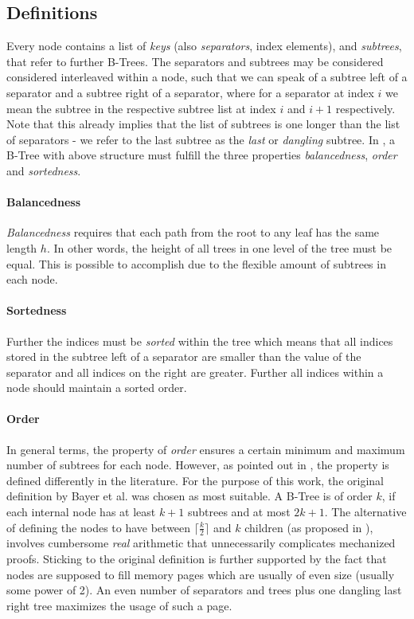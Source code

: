 \subsection{Definitions}
\label{sec:data_structure_defs}

Every node contains a list of \textit{keys} (also \textit{separators}, index elements), and \textit{subtrees},
that refer to further B-Trees.
The separators and subtrees may be considered considered interleaved within a node,
such that we can speak of a subtree left of a separator and a subtree right of a separator,
where for a separator at index $i$ we mean the subtree in the respective
subtree list at index $i$ and $i+1$ respectively.
Note that this already implies that the list of subtrees is one
longer than the list of separators - we refer to the last subtree
as the \textit{last} or \textit{dangling} subtree.
In \parencite{DBLP:journals/acta/BayerM72},
a B-Tree with above structure must fulfill the three properties
\textit{balancedness}, \textit{order} and \textit{sortedness}.

\paragraph{Balancedness} \textit{Balancedness} requires
that each path from the root to any leaf has the same length $h$.
In other words, the height of all trees in one level of the tree must be equal.
This is possible to accomplish due to the flexible amount of subtrees
in each node.

\paragraph{Sortedness} Further the indices must be \textit{sorted} within the tree which means that all indices stored
in the subtree left of a separator are smaller than the value of the separator
and all indices on the right are greater.
Further all indices within a node should maintain a sorted order.

\paragraph{Order} In general terms, the property of \textit{order} ensures a certain minimum and maximum
number of subtrees for each node.
However, as pointed out in \parencite{DBLP:books/daglib/0095349_mod},
the property is defined differently in the literature.
For the purpose of this work, the original definition by Bayer et al. was chosen as most suitable.
A B-Tree is of order $k$, if each internal node has at least $k+1$
subtrees and at most $2k+1$.
The alternative of defining the nodes to have between $\lceil \frac{k}{2} \rceil$
and $k$ children (as proposed in \parencite{DBLP:books/lib/Knuth98a}),
involves cumbersome \textit{real} arithmetic that unnecessarily complicates
mechanized proofs.
Sticking to the original definition is further supported by the fact that nodes are supposed
to fill memory pages which are usually of even size (usually some power of 2).
An even number of separators and trees plus one dangling last right tree maximizes
the usage of such a page.

